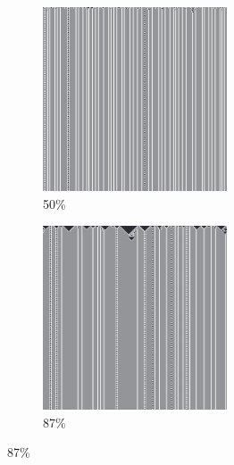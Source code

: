 \documentclass[12pt, fleqn]{report}                             %
\theoremstyle{break}                                            %
\begin{document}
\begin{figure}[ht!]
\begin{subfigure}[b]{0.4\linewidth}
          \includegraphics[width=0.6\textwidth]{Images/94/c.png}
          \caption{50\%}
        \end{subfigure}
        \begin{subfigure}[b]{0.4\linewidth}
          \includegraphics[width=0.6\textwidth]{Images/94/d.png}
          \caption{87\%}
        \end{subfigure}
      \end{figure}
\end{document}
